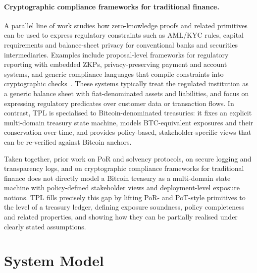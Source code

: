 \documentclass[11pt]{article}
\begin{document}
\paragraph{Cryptographic compliance frameworks for traditional finance.}
A parallel line of work studies how zero-knowledge proofs and related primitives can be used to express regulatory constraints such as AML/KYC rules, capital requirements and balance-sheet privacy for conventional banks and securities intermediaries. Examples include proposal-level frameworks for regulatory reporting with embedded ZKPs, privacy-preserving payment and account systems, and generic compliance languages that compile constraints into cryptographic checks~\cite{Decker2025,FedZK2023,ZKSurvey2024}. These systems typically treat the regulated institution as a generic balance sheet with fiat-denominated assets and liabilities, and focus on expressing regulatory predicates over customer data or transaction flows. In contrast, TPL is specialised to Bitcoin-denominated treasuries: it fixes an explicit multi-domain treasury state machine, models BTC-equivalent exposures and their conservation over time, and provides policy-based, stakeholder-specific views that can be re-verified against Bitcoin anchors.

Taken together, prior work on PoR and solvency protocols, on secure logging and transparency logs, and on cryptographic compliance frameworks for traditional finance does not directly model a Bitcoin treasury as a multi-domain state machine with policy-defined stakeholder views and deployment-level exposure notions. TPL fills precisely this gap by lifting PoR- and PoT-style primitives to the level of a treasury ledger, defining exposure soundness, policy completeness and related properties, and showing how they can be partially realised under clearly stated assumptions.

\section{System Model}
\end{document}
